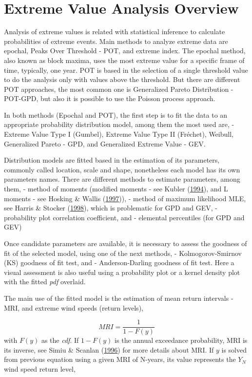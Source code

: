 \documentclass[12pt,oneside]{reedthesis}
\begin{document}
\hypertarget{extremeoverview}{%
\section{Extreme Value Analysis Overview}\label{extremeoverview}}

Analysis of extreme values is related with statistical inference to calculate probabilities of extreme events. Main methods to analyze extreme data are epochal, Peaks Over Threshold - POT, and extreme index. The epochal method, also known as block maxima, uses the most extreme value for a specific frame of time, typically, one year. POT is based in the selection of a single threshold value to do the analysis only with values above the threshold. But there are different POT approaches, the most common one is Generalized Pareto Distribution - POT-GPD, but also it is possible to use the Poisson process approach.

In both methods (Epochal and POT), the first step is to fit the data to an appropriate probability distribution model, among them the most used are, - Extreme Value Type I (Gumbel), Extreme Value Type II (Fréchet), Weibull, Generalized Pareto - GPD, and Generalized Extreme Value - GEV.

Distribution models are fitted based in the estimation of its parameters, commonly called location, scale and shape, nonetheless each model has its own parameters names. There are different methods to estimate parameters, among them, - method of moments (modified moments - see Kubler (\protect\hyperlink{ref-Kubler1994}{1994}), and L moments - see Hosking \& Wallis (\protect\hyperlink{ref-Hosking1997}{1997})), - method of maximum likelihood MLE, see Harris \& Stocker (\protect\hyperlink{ref-Harris1994}{1998}), which is problematic for GPD and GEV, - probability plot correlation coefficient, and - elemental percentiles (for GPD and GEV)

Once candidate parameters are available, it is necessary to assess the goodness of fit of the selected model, using one of the next methods, - Kolmogorov-Smirnov (KS) goodness of fit test, and - Anderson-Darling goodness of fit test. Here a visual assessment is also useful using a probability plot or a kernel density plot with the fitted \emph{pdf} overlaid.

The main use of the fitted model is the estimation of mean return intervals - MRI, and extreme wind speeds (return levels),

\[
MRI=\frac{1}{1-F(y)}
\]
with \(F(y)\) as the \emph{cdf}. If \(1-F(y)\) is the annual exceedance probability, MRI is its inverse, see Simiu \& Scanlan (\protect\hyperlink{ref-Simiu1996}{1996}) for more details about MRI. If \(y\) is solved from previous equation using a given MRI of N-years, its value represents the \(Y_N\) wind speed return level,
\end{document}
